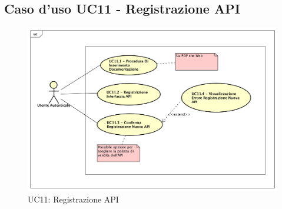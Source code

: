 \newpage
\subsection{Caso d'uso UC11 - Registrazione API}
\label{UC11}
\begin{figure}[ht]
	\centering
	\includegraphics[scale=0.45]{UML/UC11.png}
	\caption{UC11: Registrazione API}
\end{figure}

